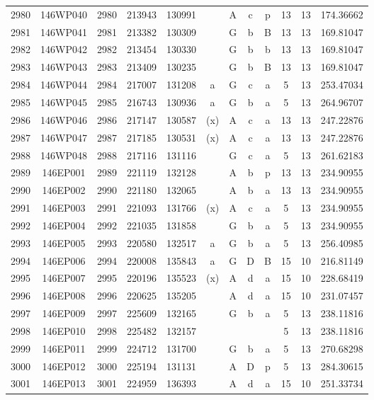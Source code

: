 \begin{tabular}{|*{12}{c|}}
2980 & 146WP040 & 2980 & 213943 & 130991 &  & A & c & p & 13 & 13 & 174.36662 \\ 
2981 & 146WP041 & 2981 & 213382 & 130309 &  & G & b & B & 13 & 13 & 169.81047 \\ 
2982 & 146WP042 & 2982 & 213454 & 130330 &  & G & b & b & 13 & 13 & 169.81047 \\ 
2983 & 146WP043 & 2983 & 213409 & 130235 &  & G & b & B & 13 & 13 & 169.81047 \\ 
2984 & 146WP044 & 2984 & 217007 & 131208 & a & G & c & a & 5 & 13 & 253.47034 \\ 
2985 & 146WP045 & 2985 & 216743 & 130936 & a & G & b & a & 5 & 13 & 264.96707 \\ 
2986 & 146WP046 & 2986 & 217147 & 130587 & (x) & A & c & a & 13 & 13 & 247.22876 \\ 
2987 & 146WP047 & 2987 & 217185 & 130531 & (x) & A & c & a & 13 & 13 & 247.22876 \\ 
2988 & 146WP048 & 2988 & 217116 & 131116 &  & G & c & a & 5 & 13 & 261.62183 \\ 
2989 & 146EP001 & 2989 & 221119 & 132128 &  & A & b & p & 13 & 13 & 234.90955 \\ 
2990 & 146EP002 & 2990 & 221180 & 132065 &  & A & b & a & 13 & 13 & 234.90955 \\ 
2991 & 146EP003 & 2991 & 221093 & 131766 & (x) & A & c & a & 5 & 13 & 234.90955 \\ 
2992 & 146EP004 & 2992 & 221035 & 131858 &  & G & b & a & 5 & 13 & 234.90955 \\ 
2993 & 146EP005 & 2993 & 220580 & 132517 & a & G & b & a & 5 & 13 & 256.40985 \\ 
2994 & 146EP006 & 2994 & 220008 & 135843 & a & G & D & B & 15 & 10 & 216.81149 \\ 
2995 & 146EP007 & 2995 & 220196 & 135523 & (x) & A & d & a & 15 & 10 & 228.68419 \\ 
2996 & 146EP008 & 2996 & 220625 & 135205 &  & A & d & a & 15 & 10 & 231.07457 \\ 
2997 & 146EP009 & 2997 & 225609 & 132165 &  & G & b & a & 5 & 13 & 238.11816 \\ 
2998 & 146EP010 & 2998 & 225482 & 132157 &  &  &  &  & 5 & 13 & 238.11816 \\ 
2999 & 146EP011 & 2999 & 224712 & 131700 &  & G & b & a & 5 & 13 & 270.68298 \\ 
3000 & 146EP012 & 3000 & 225194 & 131131 &  & A & D & p & 5 & 13 & 284.30615 \\ 
3001 & 146EP013 & 3001 & 224959 & 136393 &  & A & d & a & 15 & 10 & 251.33734 \\ 

\end{tabular}
